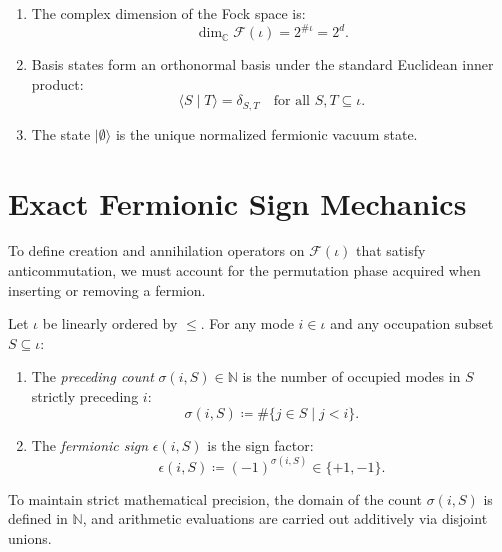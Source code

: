 \begin{proposition}
\begin{enumerate}
    \item The complex dimension of the Fock space is:
    \begin{equation}
    \dim_{\mathbb{C}} \mathcal{F}(\iota) = 2^{\#\iota} = 2^d.
    \end{equation}
    \item Basis states form an orthonormal basis under the standard Euclidean inner product:
    \begin{equation}
    \langle S \mid T \rangle = \delta_{S, T} \quad \text{for all } S, T \subseteq \iota.
    \end{equation}
    \item The state $|\emptyset\rangle$ is the unique normalized fermionic vacuum state.
\end{enumerate}
\end{proposition}

\section{Exact Fermionic Sign Mechanics}

To define creation and annihilation operators on $\mathcal{F}(\iota)$ that satisfy anticommutation, we must account for the permutation phase acquired when inserting or removing a fermion.

\begin{definition}
Let $\iota$ be linearly ordered by $\le$. For any mode $i \in \iota$ and any occupation subset $S \subseteq \iota$:
\begin{enumerate}
    \item The \emph{preceding count} $\sigma(i, S) \in \mathbb{N}$ is the number of occupied modes in $S$ strictly preceding $i$:
    \begin{equation}
    \sigma(i, S) \coloneqq \#\{j \in S \mid j < i\}.
    \end{equation}
    \item The \emph{fermionic sign} $\epsilon(i, S)$ is the sign factor:
    \begin{equation}
    \epsilon(i, S) \coloneqq (-1)^{\sigma(i, S)} \in \{+1, -1\}.
    \end{equation}
\end{enumerate}
\end{definition}

To maintain strict mathematical precision, the domain of the count $\sigma(i, S)$ is defined in $\mathbb{N}$, and arithmetic evaluations are carried out additively via disjoint unions.

